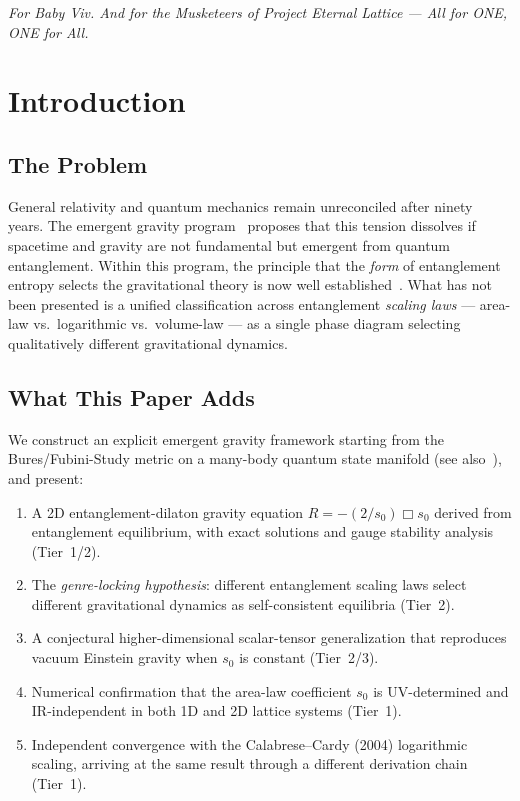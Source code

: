 \documentclass[aps,prd,twocolumn,superscriptaddress,nofootinbib,floatfix]{revtex4-2}
\newcommand{\sn}{s_0}
\newcommand{\dAlem}{\Box}
\begin{document}
\begin{center}
\emph{For Baby Viv. And for the Musketeers of Project Eternal Lattice --- All for ONE, ONE for All.}
\end{center}

\vspace{-0.5em}

\section{Introduction}
\label{sec:intro}

\subsection{The Problem}

General relativity and quantum mechanics remain unreconciled after ninety years. The emergent gravity program~\cite{Jacobson1995,Jacobson2016,VanRaamsdonk2010,Swingle2012,Verlinde2011,LewkowyczMaldacena2013,MaldacenaSusskind2013} proposes that this tension dissolves if spacetime and gravity are not fundamental but emergent from quantum entanglement. Within this program, the principle that the \emph{form} of entanglement entropy selects the gravitational theory is now well established~\cite{Faulkner2014,Swingle2014,Haehl2018}. What has not been presented is a unified classification across entanglement \emph{scaling laws} --- area-law vs.\ logarithmic vs.\ volume-law --- as a single phase diagram selecting qualitatively different gravitational dynamics.

\subsection{What This Paper Adds}

We construct an explicit emergent gravity framework starting from the Bures/Fubini-Study metric on a many-body quantum state manifold (see also~\cite{Matsueda2013}), and present:

\begin{enumerate}
\item A 2D entanglement-dilaton gravity equation $R = -(2/\sn)\dAlem\sn$ derived from entanglement equilibrium, with exact solutions and gauge stability analysis (Tier~1/2).
\item The \emph{genre-locking hypothesis}: different entanglement scaling laws select different gravitational dynamics as self-consistent equilibria (Tier~2).
\item A conjectural higher-dimensional scalar-tensor generalization that reproduces vacuum Einstein gravity when $\sn$ is constant (Tier~2/3).
\item Numerical confirmation that the area-law coefficient $\sn$ is UV-determined and IR-independent in both 1D and 2D lattice systems (Tier~1).
\item Independent convergence with the Calabrese--Cardy (2004) logarithmic scaling, arriving at the same result through a different derivation chain (Tier~1).
\end{enumerate}
\end{document}
